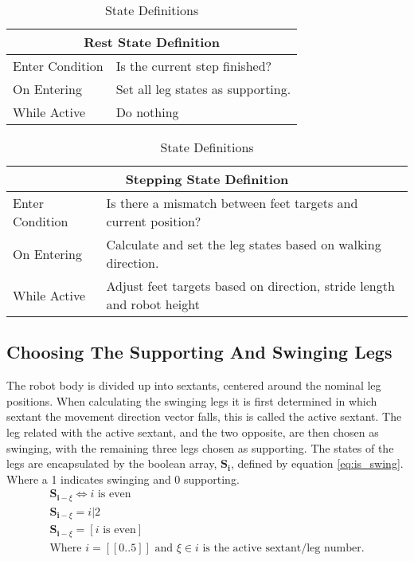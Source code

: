 \begin{table}[h]
    \center
    \begin{tabularx}{\textwidth}{|l|X|}
        \hline
        \multicolumn{2}{|c|}{Rest State Definition} \\
        \hline
        Enter Condition & Is the current step finished? \\
        \hline
        On Entering & Set all leg states as supporting. \\
        \hline
        While Active & Do nothing \\
        \hline
    \end{tabularx}
    
    \bigskip
    \noindent
    \begin{tabularx}{\textwidth}{|l|X|}
        \hline
        \multicolumn{2}{|c|}{Stepping State Definition} \\
        \hline
        Enter Condition & Is there a mismatch between feet targets and current position? \\
        \hline
        On Entering & Calculate and set the leg states based on walking direction. \\
        \hline
        While Active & Adjust feet targets based on direction, stride length and robot height\\
        \hline
    \end{tabularx}
    \caption{State Definitions}
    \label{tab:state_defs}
\end{table}

\newpage
\subsection{Choosing The Supporting And Swinging Legs} \label{sec:supp_swing_calc}
    The robot body is divided up into sextants, centered around the nominal leg positions. When calculating
    the swinging legs it is first determined in which sextant the movement direction vector falls, this is called the active sextant.
    The leg related with the active sextant, and the two opposite, are then chosen as swinging, with the remaining three legs chosen as supporting.
    The states of the legs are encapsulated by the boolean array, \(\boldsymbol{S_i}\), defined by equation \ref{eq:is_swing}.
    Where a 1 indicates swinging and 0 supporting.
    \begin{equation}\label{eq:is_swing}
        \begin{gathered}
            \boldsymbol{S}_{\boldsymbol{i} - \xi} \iff i \text{ is even} \\
            \boldsymbol{S}_{\boldsymbol{i} - \xi}=i|2 \\
            \boldsymbol{S}_{\boldsymbol{i} - \xi}=[i \text{ is even}] \\[0.1cm]
            \text{Where \(i = [\![0..5]\!]\) and \(\xi \in i\) is the active sextant/leg number.}
        \end{gathered}
    \end{equation}

